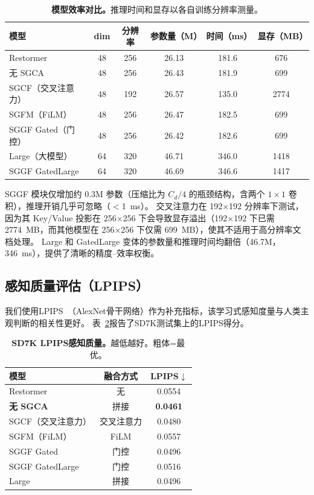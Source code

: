 \documentclass[11pt]{ctexart}
\begin{document}
\begin{table}[t]
\centering
\caption{\textbf{模型效率对比。}推理时间和显存以各自训练分辨率测量。}
\label{tab:efficiency}
\begin{tabular}{@{}lccccc@{}}
\toprule
\textbf{模型} & \textbf{dim} & \textbf{分辨率} & \textbf{参数量（M）} & \textbf{时间（ms）} & \textbf{显存（MB）} \\
\midrule
Restormer              & 48 & 256 & 26.13 & 181.6 & 676 \\
无 SGCA                & 48 & 256 & 26.43 & 181.9 & 699 \\
SGCF（交叉注意力）     & 48 & 192 & 26.57 & 135.0 & 2774 \\
SGFM（FiLM）           & 48 & 256 & 26.47 & 182.5 & 699 \\
SGGF Gated（门控）     & 48 & 256 & 26.42 & 182.6 & 699 \\
Large（大模型）        & 64 & 320 & 46.71 & 346.0 & 1418 \\
SGGF GatedLarge        & 64 & 320 & 46.69 & 346.6 & 1417 \\
\bottomrule
\end{tabular}
\end{table}

SGGF 模块仅增加约 0.3M 参数（压缩比为 $C_d/4$ 的瓶颈结构，含两个 $1\times1$ 卷积），推理开销几乎可忽略（$<$1~ms）。
交叉注意力在 192$\times$192 分辨率下测试，因为其 Key/Value 投影在 256$\times$256 下会导致显存溢出（192$\times$192 下已需 2774~MB，而其他模型在 256$\times$256 下仅需 699~MB），使其不适用于高分辨率文档处理。
Large 和 GatedLarge 变体的参数量和推理时间均翻倍（46.7M，346~ms），提供了清晰的精度--效率权衡。

\subsection{感知质量评估（LPIPS）}

我们使用LPIPS~\cite{zhang2018lpips}（AlexNet骨干网络）作为补充指标，该学习式感知度量与人类主观判断的相关性更好。
表~\ref{tab:lpips}报告了SD7K测试集上的LPIPS得分。

\begin{table}[t]
\centering
\caption{\textbf{SD7K LPIPS感知质量。}越低越好。粗体=最优。}
\label{tab:lpips}
\begin{tabular}{@{}lcc@{}}
\toprule
\textbf{模型} & \textbf{融合方式} & \textbf{LPIPS$\downarrow$} \\
\midrule
Restormer      & 无          & 0.0554 \\
\rowcolor{gray!15}
\textbf{无 SGCA} & 拼接        & \textbf{0.0461} \\
SGCF（交叉注意力） & 交叉注意力  & 0.0480 \\
SGFM（FiLM）   & FiLM        & 0.0557 \\
SGGF Gated     & 门控        & 0.0496 \\
SGGF GatedLarge & 门控        & 0.0516 \\
Large          & 拼接        & 0.0496 \\
\bottomrule
\end{tabular}
\end{table}
\end{document}
